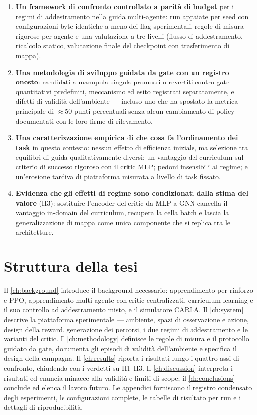 \begin{enumerate}
  \item \textbf{Un framework di confronto controllato a parità di
        budget} per i regimi di addestramento nella guida multi-agente:
        run appaiate per seed con configurazioni byte-identiche a meno
        dei flag sperimentali, regole di misura rigorose per agente e
        una valutazione a tre livelli (flusso di addestramento, ricalcolo
        statico, valutazione finale del checkpoint con trasferimento di
        mappa).
  \item \textbf{Una metodologia di sviluppo guidata da gate con un
        registro onesto}: candidati a manopola singola promossi o
        revertiti contro gate quantitativi predefiniti, meccanismo ed
        esito registrati separatamente, e difetti di validità
        dell'ambiente --- incluso uno che ha spostato la metrica
        principale di $\approx 50$ punti percentuali senza alcun
        cambiamento di policy --- documentati con le loro firme di
        rilevamento.
  \item \textbf{Una caratterizzazione empirica di che cosa fa
        l'ordinamento dei task} in questo contesto: nessun effetto di
        efficienza iniziale, ma selezione tra equilibri di guida
        qualitativamente diversi; un vantaggio del curriculum sul
        criterio di successo rigoroso con il critic MLP; pedoni
        insensibili al regime; e un'erosione tardiva di piattaforma
        misurata a livello di task fissato.
  \item \textbf{Evidenza che gli effetti di regime sono condizionati
        dalla stima del valore} (H3): sostituire l'encoder del critic da
        MLP a GNN cancella il vantaggio in-domain del curriculum,
        recupera la cella batch e lascia la generalizzazione di mappa
        come unica componente che si replica tra le architetture.
\end{enumerate}

\section{Struttura della tesi}
\label{sec:outline}

Il \cref{ch:background} introduce il background necessario:
apprendimento per rinforzo e PPO, apprendimento multi-agente con critic
centralizzati, curriculum learning e il suo controllo ad addestramento
misto, e il simulatore CARLA. Il \cref{ch:system} descrive la
piattaforma sperimentale --- ambiente, spazi di osservazione e azione,
design della reward, generazione dei percorsi, i due regimi di
addestramento e le varianti del critic. Il \cref{ch:methodology}
definisce le regole di misura e il protocollo guidato da gate, documenta
gli episodi di validità dell'ambiente e specifica il design della
campagna. Il \cref{ch:results} riporta i risultati lungo i quattro assi
di confronto, chiudendo con i verdetti su H1--H3. Il
\cref{ch:discussion} interpreta i risultati ed enuncia minacce alla
validità e limiti di scope; il \cref{ch:conclusions} conclude ed elenca
il lavoro futuro. Le appendici forniscono il registro condensato degli
esperimenti, le configurazioni complete, le tabelle di risultato per run
e i dettagli di riproducibilità.
